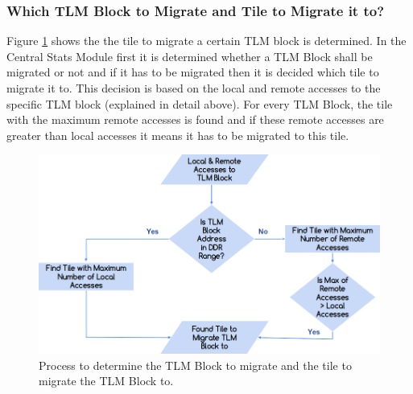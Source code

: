 \documentclass{listhesis}
\begin{document}
\subsubsection{Which TLM Block to Migrate and Tile to Migrate it to?}
Figure \ref{fig:tiletomigrate} shows the the tile to migrate a certain TLM block is determined. In the Central Stats Module first it is determined whether a TLM Block shall be migrated or not and if it has to be migrated then it is decided which tile to migrate it to. This decision is based on the local and remote accesses to the specific TLM block (explained in detail above). For every TLM Block, the tile with the maximum remote accesses is found and if these remote accesses are greater than local accesses it means it has to be migrated to this tile.\\
\begin{figure}
  \includegraphics[width=0.4\linewidth]{tiletomigrate.png}
  \centering
  \caption{Process to determine the TLM Block to migrate and the tile to migrate the TLM Block to.}
  \label{fig:tiletomigrate}
\end{figure}
\end{document}
